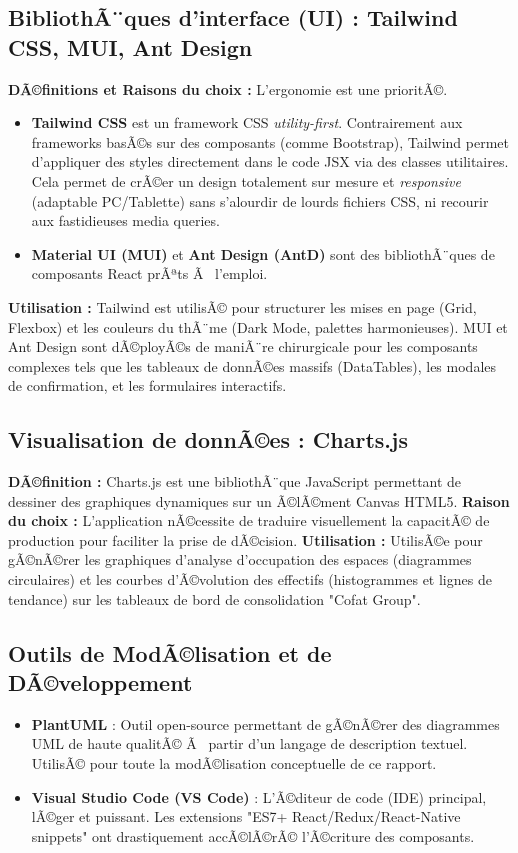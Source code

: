 \subsection{BibliothÃ¨ques d'interface (UI) : Tailwind CSS, MUI, Ant Design}
\textbf{DÃ©finitions et Raisons du choix :} L'ergonomie est une prioritÃ©. 
\begin{itemize}
    \item \textbf{Tailwind CSS} est un framework CSS \textit{utility-first}. Contrairement aux frameworks basÃ©s sur des composants (comme Bootstrap), Tailwind permet d'appliquer des styles directement dans le code JSX via des classes utilitaires. Cela permet de crÃ©er un design totalement sur mesure et \textit{responsive} (adaptable PC/Tablette) sans s'alourdir de lourds fichiers CSS, ni recourir aux fastidieuses media queries.
    \item \textbf{Material UI (MUI)} et \textbf{Ant Design (AntD)} sont des bibliothÃ¨ques de composants React prÃªts Ã  l'emploi. 
\end{itemize}
\textbf{Utilisation :} Tailwind est utilisÃ© pour structurer les mises en page (Grid, Flexbox) et les couleurs du thÃ¨me (Dark Mode, palettes harmonieuses). MUI et Ant Design sont dÃ©ployÃ©s de maniÃ¨re chirurgicale pour les composants complexes tels que les tableaux de donnÃ©es massifs (DataTables), les modales de confirmation, et les formulaires interactifs.

\subsection{Visualisation de donnÃ©es : Charts.js}
\textbf{DÃ©finition :} Charts.js est une bibliothÃ¨que JavaScript permettant de dessiner des graphiques dynamiques sur un Ã©lÃ©ment Canvas HTML5.
\newline
\textbf{Raison du choix :} L'application nÃ©cessite de traduire visuellement la capacitÃ© de production pour faciliter la prise de dÃ©cision.
\newline
\textbf{Utilisation :} UtilisÃ©e pour gÃ©nÃ©rer les graphiques d'analyse d'occupation des espaces (diagrammes circulaires) et les courbes d'Ã©volution des effectifs (histogrammes et lignes de tendance) sur les tableaux de bord de consolidation "Cofat Group".

\subsection{Outils de ModÃ©lisation et de DÃ©veloppement}
\begin{itemize}
    \item \textbf{PlantUML} : Outil open-source permettant de gÃ©nÃ©rer des diagrammes UML de haute qualitÃ© Ã  partir d'un langage de description textuel. UtilisÃ© pour toute la modÃ©lisation conceptuelle de ce rapport.
    \item \textbf{Visual Studio Code (VS Code)} : L'Ã©diteur de code (IDE) principal, lÃ©ger et puissant. Les extensions "ES7+ React/Redux/React-Native snippets" ont drastiquement accÃ©lÃ©rÃ© l'Ã©criture des composants.
\end{itemize}

